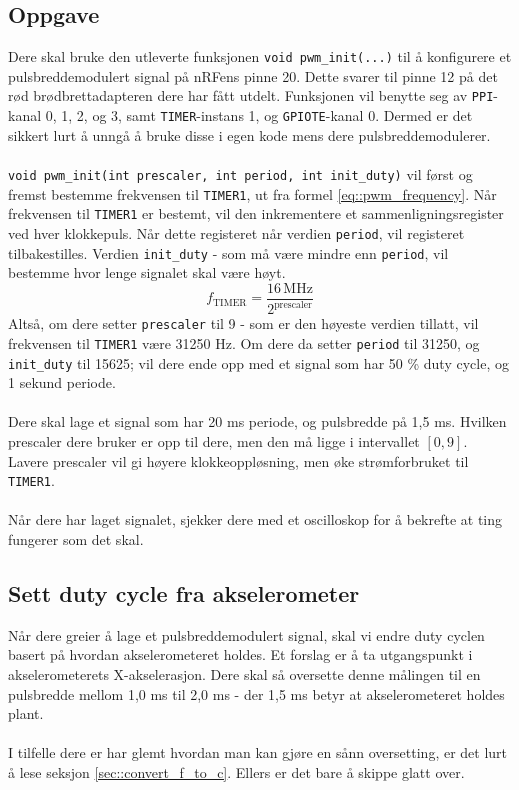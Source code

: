 \documentclass[11pt,a4paper]{article}
\begin{document}
\subsection{Oppgave}
Dere skal bruke den utleverte funksjonen \texttt{void pwm_init(...)} til å konfigurere et pulsbreddemodulert signal på nRFens pinne 20. Dette svarer til pinne 12 på det rød brødbrettadapteren dere har fått utdelt. Funksjonen vil benytte seg av \texttt{PPI}-kanal 0, 1, 2, og 3, samt \texttt{TIMER}-instans 1, og \texttt{GPIOTE}-kanal 0. Dermed er det sikkert lurt å unngå å bruke disse i egen kode mens dere pulsbreddemodulerer.\\
\\
\texttt{void pwm_init(int prescaler, int period, int init_duty)} vil først og fremst bestemme frekvensen til \texttt{TIMER1}, ut fra formel \ref{eq::pwm_frequency}. Når frekvensen til \texttt{TIMER1} er bestemt, vil den inkrementere et sammenligningsregister ved hver klokkepuls. Når dette registeret når verdien \texttt{period}, vil registeret tilbakestilles. Verdien \texttt{init_duty} - som må være mindre enn \texttt{period}, vil bestemme hvor lenge signalet skal være høyt.
\begin{equation}
f_\mathrm{TIMER} = \frac{16\,\mathrm{MHz}}{2^{\mathrm{prescaler}}}
\label{eq::pwm_frequency}
\end{equation}
Altså, om dere setter \texttt{prescaler} til 9 - som er den høyeste verdien tillatt, vil frekvensen til \texttt{TIMER1} være 31250 Hz. Om dere da setter \texttt{period} til 31250, og \texttt{init_duty} til 15625; vil dere ende opp med et signal som har 50 \% duty cycle, og 1 sekund periode.\\
\\
Dere skal lage et signal som har 20 ms periode, og pulsbredde på 1,5 ms. Hvilken prescaler dere bruker er opp til dere, men den må ligge i intervallet $[0,9]$. Lavere prescaler vil gi høyere klokkeoppløsning, men øke strømforbruket til \texttt{TIMER1}.\\
\\
Når dere har laget signalet, sjekker dere med et oscilloskop for å bekrefte at ting fungerer som det skal.

\subsection{Sett duty cycle fra akselerometer}
Når dere greier å lage et pulsbreddemodulert signal, skal vi endre duty cyclen basert på hvordan akselerometeret holdes. Et forslag er å ta utgangspunkt i akselerometerets X-akselerasjon. Dere skal så oversette denne målingen til en pulsbredde mellom 1,0 ms til 2,0 ms - der 1,5 ms betyr at akselerometeret holdes plant.\\
\\
I tilfelle dere er har glemt hvordan man kan gjøre en sånn oversetting, er det lurt å lese seksjon \ref{sec::convert_f_to_c}. Ellers er det bare å skippe glatt over.
\end{document}
